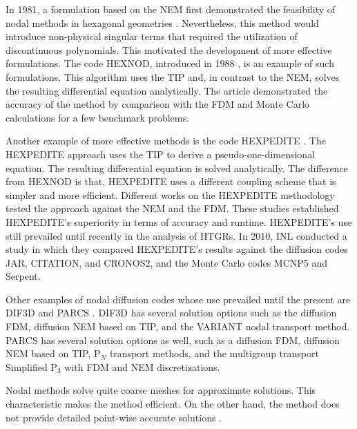 \documentclass[11pt,letterpaper]{article}
\begin{document}
In 1981, a formulation based on the \gls{NEM} first demonstrated the feasibility of nodal methods in hexagonal geometries \cite{duracz_nodal_1981}.
Nevertheless, this method would introduce non-physical singular terms that required the utilization of discontinuous polynomials.
This motivated the development of more effective formulations.
The code HEXNOD, introduced in 1988 \cite{wagner_three-dimensional_1989}, is an example of such formulations.
This algorithm uses the \gls{TIP} and, in contrast to the \gls{NEM}, solves the resulting differential equation analytically.
The article demonstrated the accuracy of the method by comparison with the \gls{FDM} and Monte Carlo calculations for a few benchmark problems.

Another example of more effective methods is the code HEXPEDITE \cite{fitzpatrick_hexpedite_1992}.
The HEXPEDITE approach uses the \gls{TIP} to derive a pseudo-one-dimensional equation.
The resulting differential equation is solved analytically.
The difference from HEXNOD is that, HEXPEDITE uses a different coupling scheme that is simpler and more efficient.
Different works \cite{fitzpatrick_hexpedite_1992}\cite{fitzpatrick_developments_1995} on the HEXPEDITE methodology tested the approach against the \gls{NEM} and the \gls{FDM}.
These studies established HEXPEDITE’s superiority in terms of accuracy and runtime.
HEXPEDITE's use still prevailed until recently in the analysis of \glspl{HTGR}.
In 2010, \gls{INL} conducted a study \cite{ortensi_deterministic_2010-1} in which they compared HEXPEDITE's results against the diffusion codes JAR, CITATION, and CRONOS2, and the Monte Carlo codes MCNP5 and Serpent.

Other examples of nodal diffusion codes whose use prevailed until the present are DIF3D \cite{lawrence_dif3d_1983} and PARCS \cite{downar_parcs_2004}.
DIF3D has several solution options such as the diffusion \gls{FDM}, diffusion \gls{NEM} based on \gls{TIP}, and the VARIANT nodal transport method.
PARCS has several solution options as well, such as a diffusion \gls{FDM}, diffusion \gls{NEM} based on \gls{TIP}, P$_{N}$ transport methods, and the multigroup transport Simplified P$_3$ with \gls{FDM} and \gls{NEM} discretizations.

Nodal methods solve quite coarse meshes for approximate solutions.
This characteristic makes the method efficient.
On the other hand, the method does not provide detailed point-wise accurate solutions \cite{kang_finite_1973}.
\end{document}

